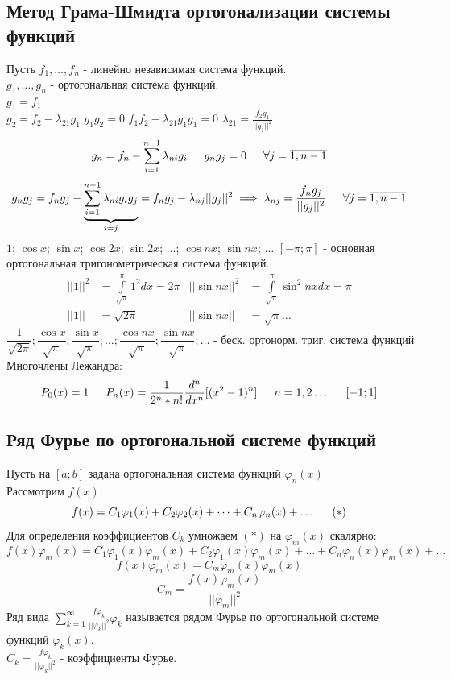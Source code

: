 \documentclass[12pt]{article}
\let\oldint\int
\let\oldsum\sum
\renewcommand{\int}{\oldint\limits}
\renewcommand{\sum}{\oldsum\limits}
\begin{document}
    \subsection{Метод Грама-Шмидта ортогонализации системы функций}\noindent
    Пусть $f_1, \dots, f_n$ - линейно независимая система функций.\\
    $g_1, \dots, g_n$ - ортогональная система функций.\\
    $g_1 = f_1$\\
    $g_2 = f_2 - \lambda_{21}g_1$ \indent $g_1 g_2 = 0$ \indent $f_1 f_2 - \lambda_{21}g_1 g_1 = 0$ \indent $\lambda_{21} = \frac{f_2 g_1}{||g_1||^2}$\\
    \[ g_n = f_n - \sum_{i=1}^{n-1}\lambda_{ni}g_i \indent g_n g_j = 0 \indent \forall j = \overline{1, n-1} \]
    \[ g_n g_j = f_n g_j - \underbrace{\sum_{i=1}^{n-1}\lambda_{ni}g_i g_j}_{i=j} = f_n g_j - \lambda_{nj}||g_j||^2 \implies \lambda_{nj} = \frac{f_n g_j}{||g_j||^2} \indent \forall j = \overline{1, n-1} \]
    $1$; $\cos x$; $\sin x$; $\cos 2x$; $\sin 2x$; $\dots$; $\cos nx$; $\sin nx$; $\dots$ \indent $[-\pi; \pi]$ - основная ортогональная тригонометрическая система функций.
    \begin{align*}
      ||1||^2 &= \int_{\sqrt{\pi}}^{\pi} 1^2 dx = 2\pi & ||\sin nx||^2 &= \int_{\sqrt{\pi}}^{\pi} \sin^2 nx dx = \pi \\
      ||1|| &= \sqrt{2\pi} & ||\sin nx|| &= \sqrt{\pi} \dots
    \end{align*}
    \[ \frac{1}{\sqrt{2\pi}}; \frac{\cos x}{\sqrt{\pi}}; \frac{\sin x}{\sqrt{\pi}}; \dots; \frac{\cos nx}{\sqrt{\pi}}; \frac{\sin nx}{\sqrt{\pi}}; \dots \text{ - беск. ортонорм. триг. система функций} \]
    Многочлены Лежандра:
    \[ P_0(x) = 1 \indent P_n(x) = \frac{1}{2^n * n!}\frac{d^n}{dx^n} [(x^2 - 1)^n] \indent n = 1, 2 \dots \indent [-1; 1] \]
    
    \subsection{Ряд Фурье по ортогональной системе функций}\noindent
    Пусть на $[a; b]$ задана ортогональная система функций ${\varphi_n (x)}$\\
    Рассмотрим $f(x)$:
    \[ f(x) = C_1 \varphi_1(x) + C_2 \varphi_2(x) + \dots + C_n \varphi_n(x) + \dots \indent (*) \]
    Для определения коэффициентов $C_k$ умножаем $(*)$ на $\varphi_m(x)$ скалярно:
    \[ f(x) \varphi_m(x) = C_1 \varphi_1(x) \varphi_m(x) + C_2 \varphi_1(x) \varphi_m(x) + \dots + C_n \varphi_n(x) \varphi_m(x) + \dots \]
    \[ f(x) \varphi_m(x) = C_m \varphi_m(x) \varphi_m(x) \]
    \[ C_m = \frac{f(x) \varphi_m(x)}{||\varphi_m||^2} \]
    Ряд вида $\sum_{k=1}^{\infty} \frac{f \varphi_k}{||\varphi_k||^2}\varphi_k$ называется рядом Фурье по ортогональной системе функций ${\varphi_k(x)}$.\\
    $C_k = \frac{f \varphi_k}{||\varphi_k||^2}$ - коэффициенты Фурье.
  
\end{document}
